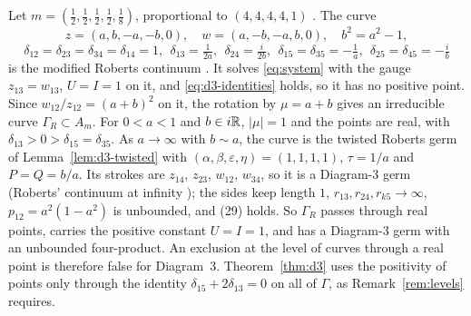 \begin{remark}\label{rem:d3-roberts}
Let $m=(\frac12,\frac12,\frac12,\frac12,\frac18)$, proportional to $(4,4,4,4,1)$
\cite[Rem.~8, p.~583]{AK}.  The curve
\[
z=(a,b,-a,-b,0),\quad w=(a,-b,-a,b,0),\quad b^2=a^2-1,
\]
\[
\delta_{12}=\delta_{23}=\delta_{34}=\delta_{14}=1,\ \ \delta_{13}=\tfrac1{2a},\ \
\delta_{24}=\tfrac{i}{2b},\ \ \delta_{15}=\delta_{35}=-\tfrac1a,\ \ \delta_{25}=\delta_{45}=-\tfrac ib
\]
is the modified Roberts continuum \cite[p.~543]{AK}.  It solves \eqref{eq:system} with the gauge
$z_{13}=w_{13}$, $U=I=1$ on it, and \eqref{eq:d3-identities} holds, so it has no positive point.
Since $w_{12}/z_{12}=(a+b)^2$ on it, the rotation by $\mu=a+b$ gives an irreducible curve
$\Gamma_R\subset A_m$.  For $0<a<1$ and $b\in i\mathbb{R}$, $|\mu|=1$ and the points are real, with
$\delta_{13}>0>\delta_{15}=\delta_{35}$.
As $a\to\infty$ with $b\sim a$, the curve is the twisted Roberts germ of
Lemma~\ref{lem:d3-twisted} with $(\alpha,\beta,\varepsilon,\eta)=(1,1,1,1)$, $\tau=1/a$ and
$P=Q=b/a$.  Its strokes are $z_{14}$, $z_{23}$, $w_{12}$, $w_{34}$, so it is a Diagram-3 germ
(Roberts' continuum at infinity \cite[\S7.2]{AK}); the sides keep length $1$,
$r_{13},r_{24},r_{k5}\to\infty$, $p_{12}=a^2(1-a^2)$ is unbounded, and (29) holds.
So $\Gamma_R$ passes through real points, carries the positive constant $U=I=1$, and has a
Diagram-3 germ with an unbounded four-product.  An exclusion at the level of curves through a
real point is therefore false for Diagram~3.  Theorem~\ref{thm:d3} uses the positivity of points
only through the identity $\delta_{15}+2\delta_{13}=0$ on all of $\Gamma$, as
Remark~\ref{rem:levels} requires.
\end{remark}
